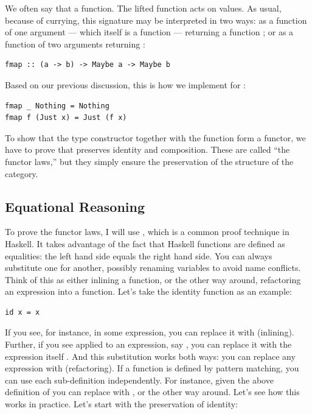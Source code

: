 \noindent
We often say
that   a function. The lifted function acts on
 values. As usual, because of currying, this signature may
be interpreted in two ways: as a function of one argument --- which
itself is a function  --- returning a
function ; or as a
function of two arguments returning :

\begin{verbatim}
fmap :: (a -> b) -> Maybe a -> Maybe b
\end{verbatim}
Based on our previous discussion, this is how we implement 
for :

\begin{verbatim}
fmap _ Nothing = Nothing
fmap f (Just x) = Just (f x)
\end{verbatim}
To show that the type constructor  together with the
function  form a functor, we have to prove that
 preserves identity and composition. These are called ``the
functor laws,'' but they simply ensure the preservation of the structure
of the category.

\subsection{Equational Reasoning}\label{equational-reasoning}

To prove the functor laws, I will use , which
is a common proof technique in Haskell. It takes advantage of the fact
that Haskell functions are defined as equalities: the left hand side
equals the right hand side. You can always substitute one for another,
possibly renaming variables to avoid name conflicts. Think of this as
either inlining a function, or the other way around, refactoring an
expression into a function. Let's take the identity function as an
example:

\begin{verbatim}
id x = x
\end{verbatim}
If you see, for instance,  in some expression, you can
replace it with  (inlining). Further, if you see 
applied to an expression, say , you can replace it
with the expression itself . And this substitution
works both ways: you can replace any expression  with
 (refactoring). If a function is defined by pattern
matching, you can use each sub-definition independently. For instance,
given the above definition of  you can replace
 with , or the other way
around. Let's see how this works in practice. Let's start with the
preservation of identity:

